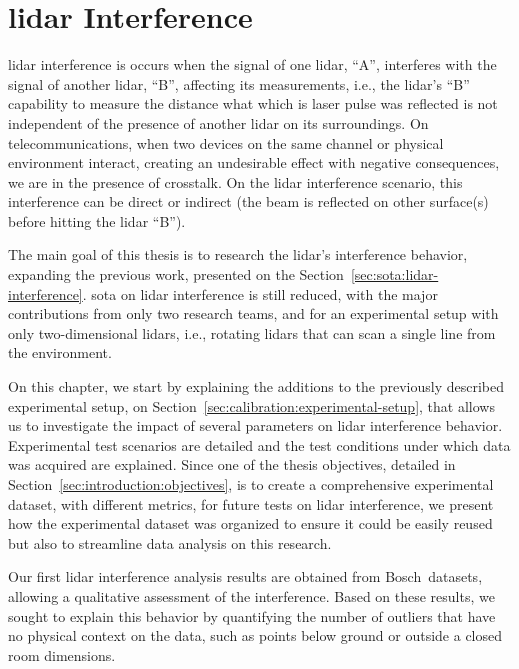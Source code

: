 \chapter{\acs{lidar} Interference}
\label{chapter:lidar-interference}

\ac{lidar} interference is occurs when the signal of one \ac{lidar}, ``A'', interferes with the signal of another \ac{lidar}, ``B'', affecting its measurements, i.e., the \ac{lidar}'s ``B'' capability to measure the distance what which is laser pulse was reflected is not independent of the presence of another \ac{lidar} on its surroundings. On telecommunications, when two devices on the same channel or physical environment interact, creating an undesirable effect with negative consequences, we are in the presence of crosstalk. On the \ac{lidar} interference scenario, this interference can be direct or indirect (the beam is reflected on other surface(s) before hitting the \ac{lidar} ``B'').

The main goal of this thesis is to research the \ac{lidar}'s interference behavior, expanding the previous work, presented on the Section~\ref{sec:sota:lidar-interference}. \acl{sota} on \ac{lidar} interference is still reduced, with the major contributions from only two research teams, and for an experimental setup with only two-dimensional \acp{lidar}, i.e., rotating \acp{lidar} that can scan a single line from the environment.

On this chapter, we start by explaining the additions to the previously described experimental setup, on Section~\ref{sec:calibration:experimental-setup}, that allows us to investigate the impact of several parameters on \ac{lidar} interference behavior. Experimental test scenarios are detailed and the test conditions under which data was acquired are explained. Since one of the thesis objectives, detailed in Section~\ref{sec:introduction:objectives}, is to create a comprehensive experimental dataset, with different metrics, for future tests on \ac{lidar} interference, we present how the experimental dataset was organized to ensure it could be easily reused but also to streamline data analysis on this research.

Our first \ac{lidar} interference analysis results are obtained from Bosch\cp~datasets, allowing a qualitative assessment of the interference. Based on these results, we sought to explain this behavior by quantifying the number of outliers that have no physical context on the data, such as points below ground or outside a closed room dimensions.

